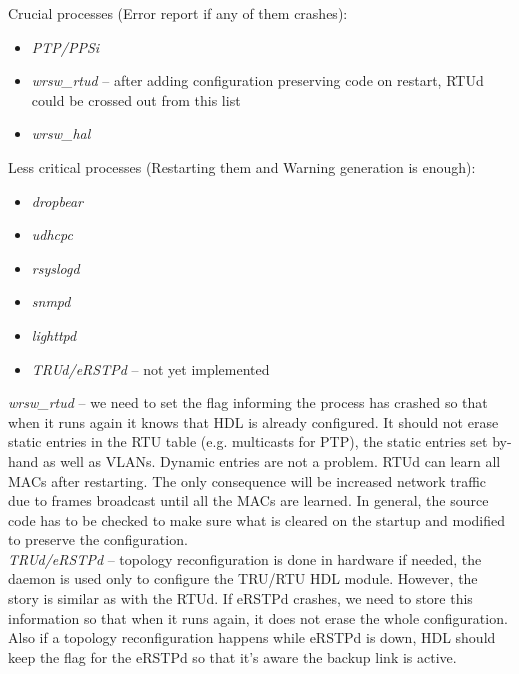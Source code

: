 \begin{pck_descr}
				Crucial processes (Error report if any of them crashes):
				\begin{itemize}
					\item \emph{PTP/PPSi}
					\item \emph{wrsw\_rtud} -- after adding configuration preserving code
						on restart, RTUd could be crossed out from this list
					\item \emph{wrsw\_hal}
				\end{itemize}
				Less critical processes (Restarting them and Warning generation is
				enough):
				\begin{itemize}
					\item \emph{dropbear}
					\item \emph{udhcpc}
					\item \emph{rsyslogd}
					\item \emph{snmpd}
					\item \emph{lighttpd}
					\item \emph{TRUd/eRSTPd} -- not yet implemented
				\end{itemize}

				\emph{wrsw\_rtud} -- we need to set the flag informing the process has
				crashed so that when it runs again it knows that HDL is already
				configured. It should not erase static entries in the RTU table (e.g.
				multicasts for PTP), the static entries set by-hand as well as VLANs.
				Dynamic entries are not a problem. RTUd can learn all MACs after
				restarting. The only consequence will be increased network traffic due
				to frames broadcast until all the MACs are learned. In general,
				the source code has to be checked to make sure what is cleared on the
				startup and modified to preserve the configuration.\\

				\emph{TRUd/eRSTPd} -- topology reconfiguration is done in hardware if
				needed, the daemon is used only to configure the TRU/RTU HDL module.
				However, the story is similar as with the RTUd. If eRSTPd crashes, we
				need to store this information so that when it runs again, it does not
				erase the whole configuration. Also if a topology reconfiguration
				happens while eRSTPd is down, HDL should keep the flag for the eRSTPd so
				that it's aware the backup link is active.
		\end{pck_descr}

